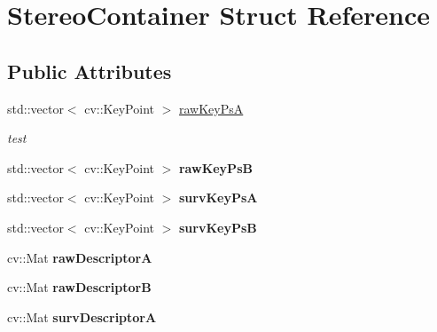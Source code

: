 \hypertarget{structStereoContainer}{}\section{Stereo\+Container Struct Reference}
\label{structStereoContainer}
\subsection*{Public Attributes}
\begin{DoxyCompactItemize}
\item 
std\+::vector$<$ cv\+::\+Key\+Point $>$ \hyperlink{structStereoContainer_a40e7fc7b7300a3afcae551fd43319745}{raw\+Key\+PsA}\hypertarget{structStereoContainer_a40e7fc7b7300a3afcae551fd43319745}{}\label{structStereoContainer_a40e7fc7b7300a3afcae551fd43319745}

\begin{DoxyCompactList}\small\item\em test \end{DoxyCompactList}\item 
std\+::vector$<$ cv\+::\+Key\+Point $>$ {\bfseries raw\+Key\+PsB}\hypertarget{structStereoContainer_ade36b1993d6b693bbe11b0b1a668ee2b}{}\label{structStereoContainer_ade36b1993d6b693bbe11b0b1a668ee2b}

\item 
std\+::vector$<$ cv\+::\+Key\+Point $>$ {\bfseries surv\+Key\+PsA}\hypertarget{structStereoContainer_aae7250306edfa8afe63a4466e012f0a7}{}\label{structStereoContainer_aae7250306edfa8afe63a4466e012f0a7}

\item 
std\+::vector$<$ cv\+::\+Key\+Point $>$ {\bfseries surv\+Key\+PsB}\hypertarget{structStereoContainer_ad5754e24a855125d693f07a4efeed338}{}\label{structStereoContainer_ad5754e24a855125d693f07a4efeed338}

\item 
cv\+::\+Mat {\bfseries raw\+DescriptorA}\hypertarget{structStereoContainer_a7fdf856050cb18478609d435d675679f}{}\label{structStereoContainer_a7fdf856050cb18478609d435d675679f}

\item 
cv\+::\+Mat {\bfseries raw\+DescriptorB}\hypertarget{structStereoContainer_abefe3f49025452e365ea53db92d3575d}{}\label{structStereoContainer_abefe3f49025452e365ea53db92d3575d}

\item 
cv\+::\+Mat {\bfseries surv\+DescriptorA}\hypertarget{structStereoContainer_a45bbc131dd10be1c038d6341187d7757}{}\label{structStereoContainer_a45bbc131dd10be1c038d6341187d7757}


\end{DoxyCompactItemize}
